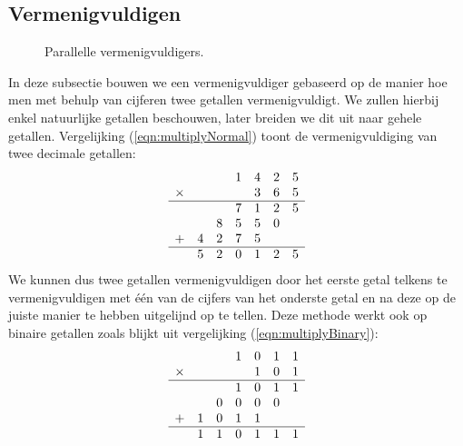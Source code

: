 \subsection{Vermenigvuldigen}
\begin{figure}[htb]
\centering
{}
\caption{Parallelle vermenigvuldigers.}
\end{figure}
In deze subsectie bouwen we een vermenigvuldiger gebaseerd op de manier hoe men met behulp van cijferen twee getallen vermenigvuldigt. We zullen hierbij enkel natuurlijke getallen beschouwen, later breiden we dit uit naar gehele getallen. Vergelijking (\ref{eqn:multiplyNormal}) toont de vermenigvuldiging van twee decimale getallen:
\begin{equation}
\begin{array}{lcccccc}
&&&1&4&2&5\\
\times&&&&3&6&5\\\hline
&&&7&1&2&5\\
&&8&5&5&0&\\
+&4&2&7&5&&\\\hline
&5&2&0&1&2&5
\end{array}
\label{eqn:multiplyNormal}
\end{equation}
We kunnen dus twee getallen vermenigvuldigen door het eerste getal telkens te vermenigvuldigen met \'e\'en van de cijfers van het onderste getal en na deze op de juiste manier te hebben uitgelijnd op te tellen. Deze methode werkt ook op binaire getallen zoals blijkt uit vergelijking (\ref{eqn:multiplyBinary}):
\begin{equation}
\begin{array}{lcccccc}
&&&1&0&1&1\\
\times&&&&1&0&1\\\hline
&&&1&0&1&1\\
&&0&0&0&0&\\
+&1&0&1&1&&\\\hline
&1&1&0&1&1&1
\end{array}
\label{eqn:multiplyBinary}
\end{equation}
